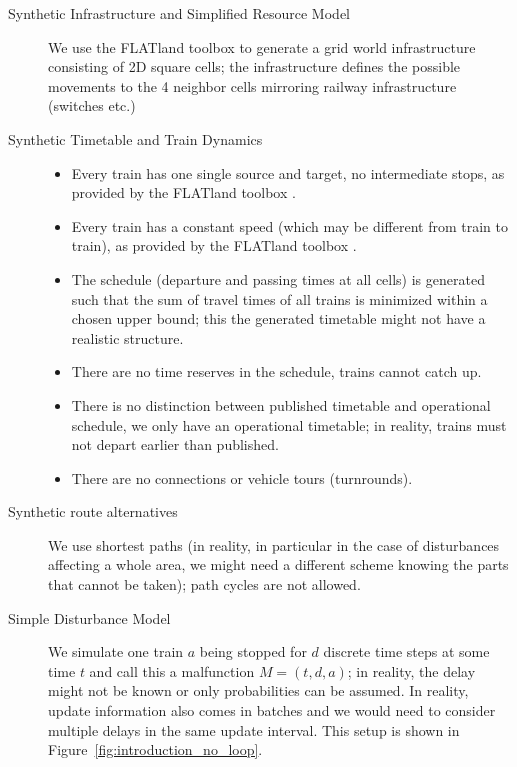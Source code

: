 \documentclass{article}
\begin{document}
\begin{description}
\item[Synthetic Infrastructure and Simplified Resource Model] We use the FLATland toolbox \cite{aicrowdFLATland} to generate a grid world infrastructure consisting of 2D square cells; the infrastructure defines the possible movements to the 4 neighbor cells mirroring railway infrastructure (switches etc.)
\item[Synthetic Timetable and Train Dynamics]
\begin{itemize}
    \item Every train has one single source and target, no intermediate stops, as provided by the FLATland toolbox \cite{aicrowdFLATland}.
    \item Every train has a constant speed (which may be different from train to train), as provided by the FLATland toolbox \cite{aicrowdFLATland}.
    \item The schedule (departure and passing times at all cells) is generated such that the sum of travel times of all trains is minimized within a chosen upper bound; this the generated timetable might not have a realistic structure.
    \item There are no time reserves in the schedule, trains cannot catch up.
    \item There is no distinction between published timetable and operational schedule, we only have an operational timetable; in reality, trains must not depart earlier than published.
    \item There are no connections or vehicle tours (turnrounds).
\end{itemize}
\item[Synthetic route alternatives] We use shortest paths (in reality, in particular in the case of disturbances affecting a whole area, we might need a different scheme knowing the parts that cannot be taken); path cycles are not allowed.
\item[Simple Disturbance Model] We simulate one train $a$ being stopped for $d$ discrete time steps at some time $t$ and call this a malfunction $M=(t,d, a)$; in reality, the delay might not be known or only probabilities can be assumed. In reality, update information also comes in batches and we would need to consider multiple delays in the same update interval. This setup is shown in Figure~\ref{fig:introduction_no_loop}.
\end{description}
%
\end{document}
